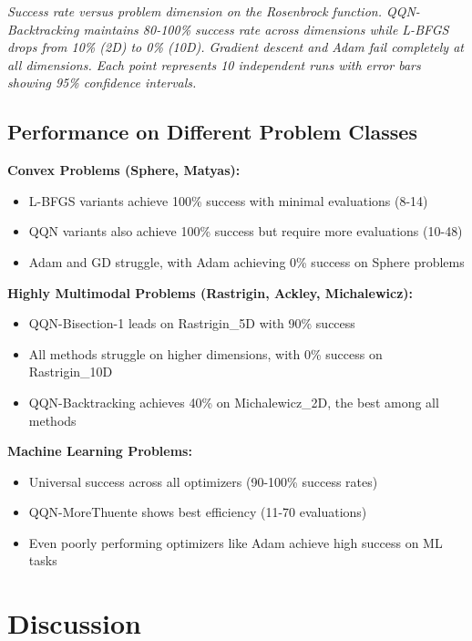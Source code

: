 \emph{Success rate versus problem dimension on the Rosenbrock function. QQN-Backtracking maintains 80-100\% success rate across dimensions while L-BFGS drops from 10\% (2D) to 0\% (10D). Gradient descent and Adam fail completely at all dimensions. Each point represents 10 independent runs with error bars showing 95\% confidence intervals.}

\hypertarget{performance-on-different-problem-classes}{%
\subsection{Performance on Different Problem Classes}\label{performance-on-different-problem-classes}}

\textbf{Convex Problems (Sphere, Matyas):}

\begin{itemize}
\tightlist
\item
  L-BFGS variants achieve 100\% success with minimal evaluations (8-14)
\item
  QQN variants also achieve 100\% success but require more evaluations (10-48)
\item
  Adam and GD struggle, with Adam achieving 0\% success on Sphere problems
\end{itemize}

\textbf{Highly Multimodal Problems (Rastrigin, Ackley, Michalewicz):}

\begin{itemize}
\tightlist
\item
  QQN-Bisection-1 leads on Rastrigin\_5D with 90\% success
\item
  All methods struggle on higher dimensions, with 0\% success on Rastrigin\_10D
\item
  QQN-Backtracking achieves 40\% on Michalewicz\_2D, the best among all methods
\end{itemize}

\textbf{Machine Learning Problems:}

\begin{itemize}
\tightlist
\item
  Universal success across all optimizers (90-100\% success rates)
\item
  QQN-MoreThuente shows best efficiency (11-70 evaluations)
\item
  Even poorly performing optimizers like Adam achieve high success on ML tasks
\end{itemize}

\hypertarget{discussion}{%
\section{Discussion}\label{discussion}}

